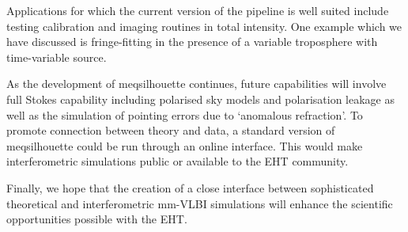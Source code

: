 %
Applications for which the current version of the pipeline is well suited include testing calibration and imaging routines in total intensity. One example which we have discussed is fringe-fitting in the presence of a variable troposphere with time-variable source.  


As the development of {\sc meqsilhouette} continues, future capabilities will involve full Stokes capability including polarised sky models and polarisation leakage as well as the simulation of pointing errors due to `anomalous refraction'.  To promote connection between theory and data, a standard version of {\sc meqsilhouette} could be run through an online interface. This would make interferometric simulations public or available to the EHT community.  


Finally, we hope that the creation of a close interface between sophisticated theoretical and interferometric mm-VLBI simulations will enhance the scientific opportunities possible with the EHT. 











